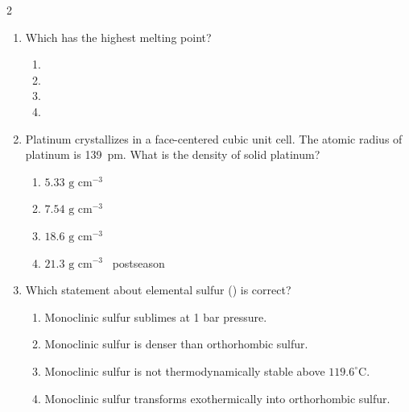 \documentclass[titlepage,10pt,letterpaper]{article}
\begin{document}
\begin{multicols}{2}
\begin{enumerate}[leftmargin=*]
\item Which has the highest melting point?
\begin{enumerate}[label=(\alph*)]
    \item {}
    \item {}
    \item {}
    \item {}
\end{enumerate}

\item Platinum crystallizes in a face-centered cubic unit cell. The atomic radius of platinum is 139~pm. What is the density of solid platinum?
\begin{enumerate}[label=(\alph*)]
    \item $5.33\text{ g cm}^{-3}$
    \item $7.54\text{ g cm}^{-3}$
    \item $18.6\text{ g cm}^{-3}$
    \item $21.3\text{ g cm}^{-3}$
\ postseason\end{enumerate}

\item Which statement about elemental sulfur () is correct?
\begin{center}
\end{center}
\begin{enumerate}[label=(\alph*)]
    \item Monoclinic sulfur sublimes at 1 bar pressure.
    \item Monoclinic sulfur is denser than orthorhombic sulfur.
    \item Monoclinic sulfur is not thermodynamically stable above $119.6^\circ\text{C}$.
    \item Monoclinic sulfur transforms exothermically into orthorhombic sulfur.
\end{enumerate}


\end{enumerate}
\end{multicols}
\end{document}
